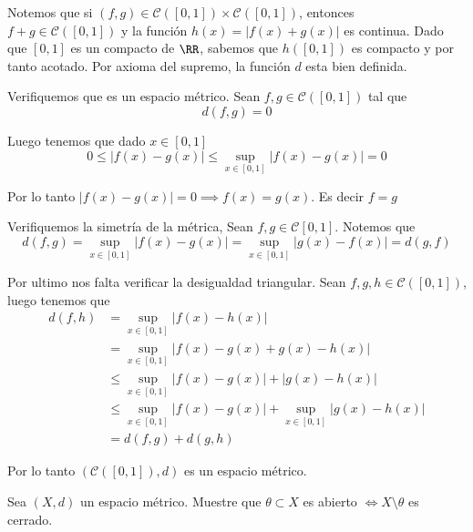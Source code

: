 \documentclass[a4paper,oneside,10.5pt]{USMArt}
\begin{document}
\begin{sol}
  Notemos que si $(f, g) \in \mathcal{C}([0, 1]) \times \mathcal{C}([0, 1])$, entonces $f + g \in \mathcal{C}([0, 1])$ y la función $h(x) = |f(x) + g(x)|$ es continua. Dado que $[0, 1]$ es un compacto de $\RR$, sabemos que $h([0, 1])$ es compacto y por tanto acotado. Por axioma del supremo, la función $d$ esta bien definida.
  \newline

  Verifiquemos que es un espacio métrico. Sean $f, g \in \mathcal{C}([0, 1])$ tal que
  \begin{equation*}
    d(f, g) = 0
  \end{equation*}

  Luego tenemos que dado $x \in [0, 1]$
  \begin{equation*}
    0 \leq |f(x) - g(x)| \leq \sup_{x \in [0, 1]} |f(x) - g(x)| = 0
  \end{equation*}

  Por lo tanto $|f(x) - g(x)| = 0 \implies f(x) = g(x)$. Es decir $f = g$
  \newline

  Verifiquemos la simetría de la métrica, Sean $f, g \in \mathcal{C}[0, 1]$. Notemos que
  \begin{equation*}
    d(f, g) = \sup_{x \in [0, 1]} |f(x) - g(x)| = \sup_{x \in [0, 1]} |g(x) - f(x)| = d(g, f)
  \end{equation*}

  Por ultimo nos falta verificar la desigualdad triangular. Sean $f, g, h \in \mathcal{C}([0, 1])$, luego tenemos que
  \begin{align*}
    d(f, h) &= \sup_{x \in [0, 1]} |f(x) - h(x)|\\
            &= \sup_{x \in [0, 1]} |f(x) - g(x) + g(x) - h(x)|\\
            &\leq \sup_{x \in [0, 1]} |f(x) - g(x)| + |g(x) - h(x)|\\
            &\leq \sup_{x \in [0, 1]} |f(x) - g(x)| + \sup_{x \in [0, 1]} |g(x) - h(x)|\\
            &= d(f, g) + d(g, h)
  \end{align*}

  Por lo tanto $(\mathcal{C}([0, 1]), d)$ es un espacio métrico.
\end{sol}

\begin{prob}
  Sea $(X, d)$ un espacio métrico. Muestre que $\theta \subset X$ es abierto $\iff X \setminus \theta$ es cerrado.
\end{prob}
\end{document}
